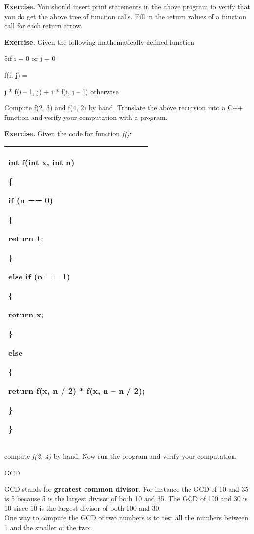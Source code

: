 \documentclass[
]{article}
\begin{document}
\textbf{Exercise.} You should insert print statements in the above
program to verify that you do get the above tree of function calls. Fill
in the return values of a function call for each return arrow.

\textbf{Exercise.} Given the following mathematically defined function

5if i = 0 or j = 0

f(i, j) =

j * f(i -- 1, j) + i * f(i, j -- 1) otherwise

Compute f(2, 3) and f(4, 2) by hand. Translate the above recursion into
a C++ function and verify your computation with a program.

\textbf{Exercise.} Given the code for function \emph{f()}:

\begin{longtable}[]{@{}l@{}}
\toprule
\endhead
\begin{minipage}[t]{0.97\columnwidth}\raggedright
int f(int x, int n)

\{

if (n == 0)

\{

return 1;

\}

else if (n == 1)

\{

return x;

\}

else

\{

return f(x, n / 2) * f(x, n -- n / 2);

\}

\}\strut
\end{minipage}\tabularnewline
\bottomrule
\end{longtable}

compute \emph{f(2, 4)} by hand. Now run the program and verify your
computation.

GCD

GCD stands for \textbf{greatest common divisor}. For instance the GCD of
10 and 35 is 5 because 5 is the largest divisor of both 10 and 35. The
GCD of 100 and 30 is 10 since 10 is the largest divisor of both 100 and
30.\\

One way to compute the GCD of two numbers is to test all the numbers
between 1 and the smaller of the two:
\end{document}
